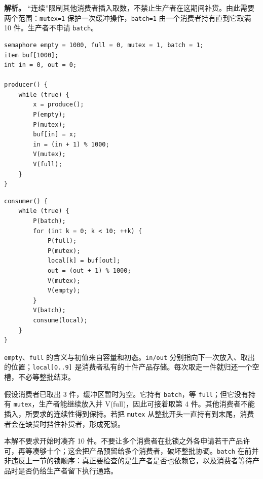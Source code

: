
\textbf{解析。} ``连续''限制其他消费者插入取数，不禁止生产者在这期间补货。由此需要两个范围：\allowbreak{}\texttt{mutex=1} 保护一次缓冲操作，\allowbreak{}\texttt{batch=1} 由一个消费者持有直到它取满 10 件。生产者不申请 \allowbreak{}\texttt{batch}。

\par\medskip\noindent
\begin{minipage}{\linewidth}
\begin{verbatim}
semaphore empty = 1000, full = 0, mutex = 1, batch = 1;
item buf[1000];
int in = 0, out = 0;

producer() {
    while (true) {
        x = produce();
        P(empty);
        P(mutex);
        buf[in] = x;
        in = (in + 1) % 1000;
        V(mutex);
        V(full);
    }
}
\end{verbatim}
\end{minipage}\par\medskip

\par\medskip\noindent
\begin{minipage}{\linewidth}
\begin{verbatim}
consumer() {
    while (true) {
        P(batch);
        for (int k = 0; k < 10; ++k) {
            P(full);
            P(mutex);
            local[k] = buf[out];
            out = (out + 1) % 1000;
            V(mutex);
            V(empty);
        }
        V(batch);
        consume(local);
    }
}
\end{verbatim}
\end{minipage}\par\medskip

\allowbreak{}\texttt{empty}、\allowbreak{}\texttt{full} 的含义与初值来自容量和初态。\allowbreak{}\texttt{in/out} 分别指向下一次放入、取出的位置；\allowbreak{}\texttt{local{[}0..9{]}} 是消费者私有的十件产品存储。每次取走一件就归还一个空槽，不必等整批结束。

假设消费者已取出 3 件，缓冲区暂时为空。它持有 \allowbreak{}\texttt{batch}，等 \allowbreak{}\texttt{full}；但它没有持有 \allowbreak{}\texttt{mutex}，生产者能继续放入并 V(full)，因此可接着取第 4 件。其他消费者不能插入，所要求的连续性得到保持。若把 \allowbreak{}\texttt{mutex} 从整批开头一直持有到末尾，消费者会在缺货时挡住补货者，形成死锁。

本解不要求开始时凑齐 10 件。不要让多个消费者在批锁之外各申请若干产品许可，再等凑够十个；这会把产品预留给多个消费者，破坏整批协调。\allowbreak{}\texttt{batch} 在前并非违反上一节的锁顺序：真正要检查的是生产者是否也依赖它，以及消费者等待产品时是否仍给生产者留下执行通路。

